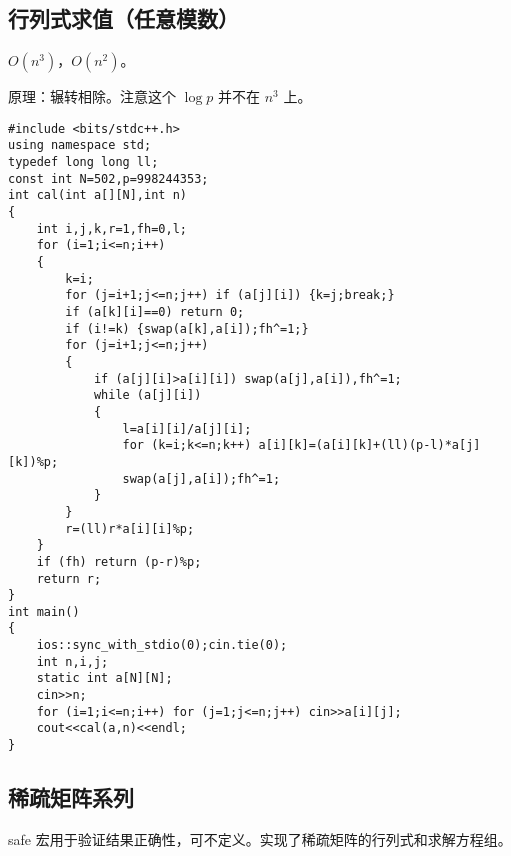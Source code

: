 \documentclass[12pt]{ctexart}
\begin{document}
\subsection{行列式求值（任意模数）}

$O(n^3)$，$O(n^2)$。

原理：辗转相除。注意这个 $\log p$ 并不在 $n^3$ 上。

\begin{lstlisting}
#include <bits/stdc++.h>
using namespace std;
typedef long long ll;
const int N=502,p=998244353;
int cal(int a[][N],int n)
{
	int i,j,k,r=1,fh=0,l;
	for (i=1;i<=n;i++)
	{
		k=i;
		for (j=i+1;j<=n;j++) if (a[j][i]) {k=j;break;}
		if (a[k][i]==0) return 0;
		if (i!=k) {swap(a[k],a[i]);fh^=1;}
		for (j=i+1;j<=n;j++)
		{
			if (a[j][i]>a[i][i]) swap(a[j],a[i]),fh^=1;
			while (a[j][i])
			{
				l=a[i][i]/a[j][i];
				for (k=i;k<=n;k++) a[i][k]=(a[i][k]+(ll)(p-l)*a[j][k])%p;
				swap(a[j],a[i]);fh^=1;
			}
		}
		r=(ll)r*a[i][i]%p;
	}
	if (fh) return (p-r)%p;
	return r;
}
int main()
{
	ios::sync_with_stdio(0);cin.tie(0);
	int n,i,j;
	static int a[N][N];
	cin>>n;
	for (i=1;i<=n;i++) for (j=1;j<=n;j++) cin>>a[i][j];
	cout<<cal(a,n)<<endl;
}
\end{lstlisting}

\subsection{稀疏矩阵系列}

safe 宏用于验证结果正确性，可不定义。实现了稀疏矩阵的行列式和求解方程组。
\end{document}
